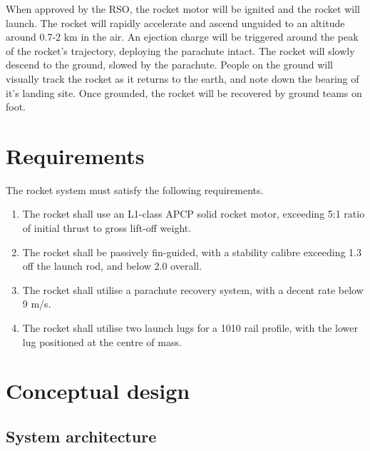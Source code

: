 \documentclass{article}
\begin{document}

When approved by the RSO, 
the rocket motor will be ignited and the rocket will launch. 
The rocket will rapidly accelerate 
and ascend unguided to an altitude around 0.7-2 km in the air. 
An ejection charge will be triggered around the peak of the rocket's trajectory, 
deploying the parachute intact. 
The rocket will slowly descend to the ground, 
slowed by the parachute. 
People on the ground will visually track the rocket as it returns to the earth, 
and note down the bearing of it's landing site. 
Once grounded, the rocket will be recovered by ground teams on foot.

\section{Requirements}


The rocket system must satisfy the following requirements.

\begin{enumerate}
    \item The rocket shall use an L1-class APCP solid rocket motor, 
	exceeding 5:1 ratio of initial thrust to gross lift-off weight.
    \item The rocket shall be passively fin-guided, 
	with a stability calibre exceeding 1.3 off the launch rod, and below 2.0 overall.
    \item The rocket shall utilise a parachute recovery system, 
	with a decent rate below 9 m/s.
    \item The rocket shall utilise two launch lugs for a 1010 rail profile, 
	with the lower lug positioned at the centre of mass.
\end{enumerate}

\section{Conceptual design}

\subsection{System architecture}

\end{document}
